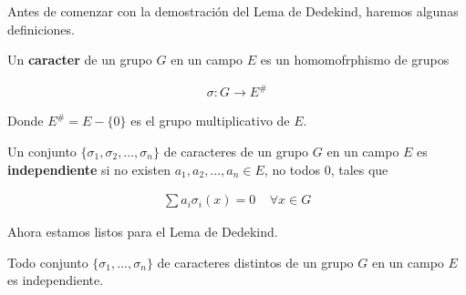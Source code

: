 Antes de comenzar con la demostración del Lema de Dedekind, haremos
algunas definiciones.

\begin{definicion} 
    Un \textbf{caracter} de un grupo $G$ en un campo $E$ es un homomofrphismo de grupos
    
    \begin{align}
            \sigma: G \longrightarrow E^{\#}
    \end{align}
    
    Donde $E^{\#} = E - \{0\}$ es el grupo multiplicativo de $E$.
\end{definicion}

\begin{definicion}
    Un conjunto $\{\sigma_1 , \sigma_2, \dots, \sigma_n\}$ de caracteres de un grupo $G$ en un campo $E$ es
    \textbf{independiente} si no existen $a_1, a_2, \dots, a_n \in E$, no todos 0, tales que 
    
    \begin{align}
            \sum a_i \sigma_i(x) = 0 \;\;\;\; \forall x \in G 
    \end{align}\par\null
    
\end{definicion}

Ahora estamos listos para el Lema de Dedekind.

\begin{lema}
    Todo conjunto $\{\sigma_1, \dots, \sigma_n\}$ de caracteres distintos de un grupo $G$ en un campo $E$ es independiente.
\end{lema}

